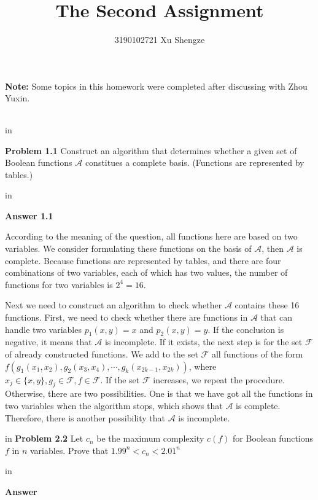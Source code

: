 \documentclass[11pt]{article}
\begin{document}
\title{{\bf The Second Assignment}}
\author{3190102721 Xu Shengze}
\date{}
\maketitle

{\bf Note:} Some topics in this homework were completed after discussing with Zhou Yuxin.

\begin{tabular*}{13cm}{r}
\hline
\end{tabular*}

 in

{\bf Problem 1.1} Construct an algorithm that determines whether a given set of Boolean functions $\mathcal{A}$ constitues a complete basis. (Functions are represented by tables.) 

 in

{\bf Answer 1.1 }

According to the meaning of the question, all functions here are based on two variables. We consider formulating these functions on the basis of $\mathcal{A}$, then $\mathcal{A}$ is complete. Because functions are represented by tables, and there are four combinations of two variables, each of which has two values, the number of functions for two variables is $2^4=16$.

Next we need to construct an algorithm to check whether $\mathcal{A}$ contains these 16 functions. First, we need to check whether there are functions in $\mathcal{A}$ that can handle two variables $p_1(x,y)=x$ and $p_2(x,y)=y$. If the conclusion is negative, it means that $\mathcal{A}$ is incomplete. If it exists, the next step is for the set $\mathcal{F}$ of already constructed functions. We add to the set $\mathcal{F}$ all functions of the form $f(g_1(x_1,x_2),g_2(x_3,x_4),\cdots,g_k(x_{2k-1},x_{2k} ))$, where $x_j\in\{x,y\},g_j\in\mathcal{F},f\in\mathcal{F}$. If the set $\mathcal{F}$ increases, we repeat the procedure. Otherwise, there are two possibilities. One is that we have got all the functions in two variables when the algorithm stops, which shows that $\mathcal{A}$ is complete. Therefore, there is another possibility that $\mathcal{A}$ is incomplete.

 in
\newpage
{\bf Problem 2.2}
Let $c_n$ be the maximum complexity $c(f)$ for Boolean functions $f$ in $n$ variables. Prove that $1.99^n<c_n<2.01^n$

 in

{\bf Answer}
\end{document}
